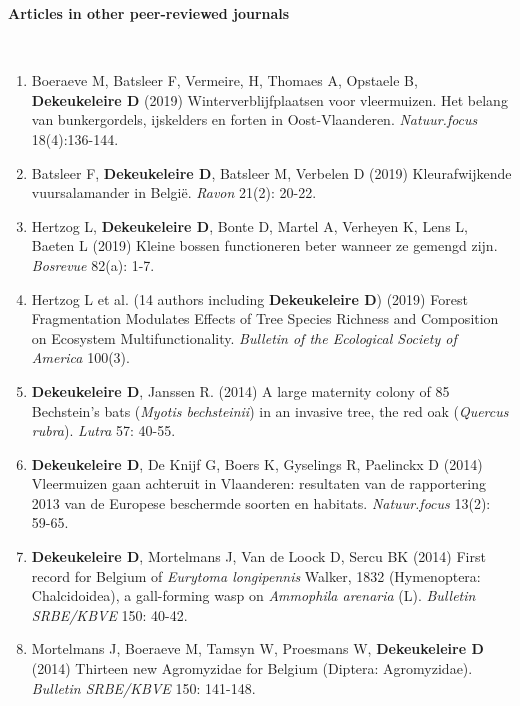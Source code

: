 \documentclass[10pt, twoside]{book} %
\begin{document}
\vspace*{1cm}
\begin{large}\textbf{Articles in other peer-reviewed journals}\end{large}\\

\begin{enumerate}
	\item Boeraeve M, Batsleer F, Vermeire, H, Thomaes A, Opstaele B, \textbf{Dekeukeleire D} (2019) Winterverblijfplaatsen voor vleermuizen. Het belang van bunkergordels, ijskelders en forten in Oost-Vlaanderen. \textit{Natuur.focus} 18(4):136-144.
	
	\item Batsleer F, \textbf{Dekeukeleire D}, Batsleer M, Verbelen D (2019) Kleurafwijkende vuursalamander in Belgi\"{e}. \textit{Ravon} 21(2): 20-22.
	
	\item Hertzog L, \textbf{Dekeukeleire D}, Bonte D, Martel A, Verheyen K, Lens L, Baeten L (2019) Kleine bossen functioneren beter wanneer ze gemengd zijn. \textit{Bosrevue} 82(a): 1-7.
	
	\item Hertzog L et al. (14 authors including \textbf{Dekeukeleire D}) (2019) Forest Fragmentation Modulates Effects of Tree Species Richness and Composition on Ecosystem Multifunctionality. \textit{Bulletin of the Ecological Society of America} 100(3).
	
	\item \textbf{Dekeukeleire D}, Janssen R. (2014) A large maternity colony of 85 Bechstein's bats (\textit{Myotis bechsteinii}) in an invasive tree, the red oak (\textit{Quercus rubra}). \textit{Lutra} 57: 40-55.
	
	\item \textbf{Dekeukeleire D}, De Knijf G, Boers K, Gyselings R, Paelinckx D (2014) Vleermuizen gaan achteruit in Vlaanderen: resultaten van de rapportering 2013 van de Europese beschermde soorten en habitats. \textit{Natuur.focus} 13(2): 59-65.
	
	\item \textbf{Dekeukeleire D}, Mortelmans J, Van de Loock D, Sercu BK (2014) First record for Belgium of \textit{Eurytoma longipennis} Walker, 1832 (Hymenoptera: Chalcidoidea), a gall-forming wasp on \textit{Ammophila arenaria} (L). \textit{Bulletin SRBE/KBVE} 150: 40-42.
	
	\item Mortelmans J, Boeraeve M, Tamsyn W, Proesmans W, \textbf{Dekeukeleire D} (2014) Thirteen new Agromyzidae for Belgium (Diptera: Agromyzidae). \textit{Bulletin SRBE/KBVE} 150: 141-148.
	

\end{enumerate}
\end{document}
